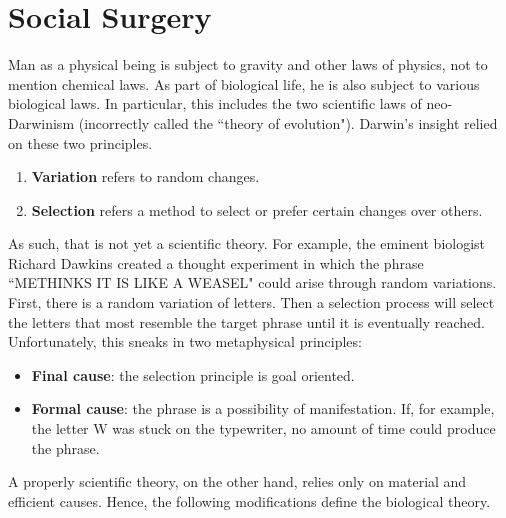 \section{Social Surgery}

Man as a physical being is subject to gravity and other laws of physics, not to mention chemical laws. As part of biological life, he is also subject to various biological laws. In particular, this includes the two scientific laws of neo-Darwinism (incorrectly called the ``theory of evolution"). Darwin's insight relied on these two principles.

\begin{enumerate}
\item \textbf{Variation} refers to random changes. 
\item \textbf{Selection} refers a method to select or prefer certain changes over others. 
\end{enumerate}
As such, that is not yet a scientific theory. For example, the eminent biologist Richard Dawkins created a thought experiment in which the phrase ``METHINKS IT IS LIKE A WEASEL" could arise through random variations. First, there is a random variation of letters. Then a selection process will select the letters that most resemble the target phrase until it is eventually reached. Unfortunately, this sneaks in two metaphysical principles:

\begin{itemize}
\item \textbf{Final cause}: the selection principle is goal oriented. 
\item \textbf{Formal cause}: the phrase is a possibility of manifestation. If, for example, the letter W was stuck on the typewriter, no amount of time could produce the phrase. 
\end{itemize}
A properly scientific theory, on the other hand, relies only on material and efficient causes. Hence, the following modifications define the biological theory.

